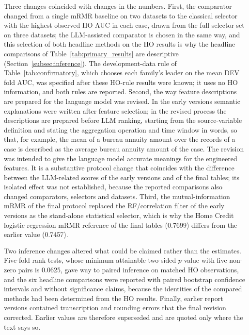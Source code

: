 \documentclass[final,5p,twocolumn]{elsarticle}
\begin{document}
Three changes coincided with changes in the numbers. First, the comparator changed from a single mRMR baseline on two datasets to the classical selector with the highest observed HO AUC in each case, drawn from the full selector set on three datasets; the LLM-assisted comparator is chosen in the same way, and this selection of both headline methods on the HO results is why the headline comparisons of Table~\ref{tab:primary_results} are descriptive (Section~\ref{subsec:inference}). The development-data rule of Table~\ref{tab:confirmatory}, which chooses each family's leader on the mean DEV fold AUC, was specified after these HO-rule results were known; it uses no HO information, and both rules are reported. Second, the way feature descriptions are prepared for the language model was revised. In the early versions semantic explanations were written after feature selection; in the revised process the descriptions are prepared before LLM ranking, starting from the source-variable definition and stating the aggregation operation and time window in words, so that, for example, the mean of a bureau annuity amount over the records of a case is described as the average bureau annuity amount of the case. The revision was intended to give the language model accurate meanings for the engineered features. It is a substantive protocol change that coincides with the difference between the LLM-related scores of the early versions and of the final tables; its isolated effect was not established, because the reported comparisons also changed comparators, selectors and datasets. Third, the mutual-information mRMR of the final protocol replaced the RF/correlation filter of the early versions as the stand-alone statistical selector, which is why the Home Credit logistic-regression mRMR reference of the final tables (0.7699) differs from the earlier value (0.7457).

Two inference changes altered what could be claimed rather than the estimates. Five-fold rank tests, whose minimum attainable two-sided $p$-value with five non-zero pairs is 0.0625, gave way to paired inference on matched HO observations, and the six headline comparisons were reported with paired bootstrap confidence intervals and without significance claims, because the identities of the compared methods had been determined from the HO results. Finally, earlier report versions contained transcription and rounding errors that the final revision corrected. Earlier values are therefore superseded and are quoted only where the text says so.
\end{document}
